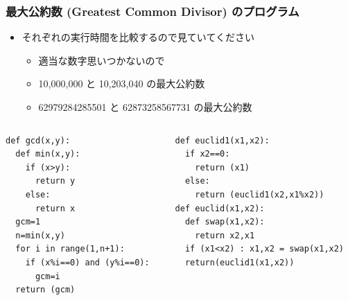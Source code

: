 \begin{frame}
\frametitle{最大公約数 (Greatest Common Divisor) のプログラム}
  \begin{itemize}
\item それぞれの実行時間を比較するので見ていてください
    \begin{itemize}
\item 適当な数字思いつかないので
\item 10,000,000 と 10,203,040 の最大公約数
\item 62979284285501 と 62873258567731 の最大公約数
    \end{itemize}
  \end{itemize}
  \begin{columns}[t]
    \begin{column}{0.45\textwidth}
      \begin{lstlisting}[caption={Naive Algorithm}]
def gcd(x,y):
  def min(x,y):
    if (x>y):
      return y
    else:
      return x
  gcm=1
  n=min(x,y)
  for i in range(1,n+1):
    if (x%i==0) and (y%i==0):
      gcm=i
  return (gcm)
      \end{lstlisting}
    \end{column}
    \begin{column}{0.45\textwidth}
      \begin{lstlisting}[caption={Euclidean Algorithm},label=lst:euclid]
def euclid1(x1,x2):
  if x2==0:
    return (x1)
  else:
    return (euclid1(x2,x1%x2))
def euclid(x1,x2):
  def swap(x1,x2):
    return x2,x1
  if (x1<x2) : x1,x2 = swap(x1,x2)
  return(euclid1(x1,x2))
      \end{lstlisting}
    \end{column}
  \end{columns}
\end{frame}

